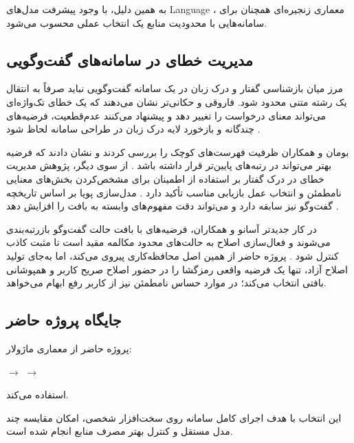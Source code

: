 به همین دلیل، با وجود پیشرفت مدل‌های  Language ،
معماری زنجیره‌ای همچنان برای سامانه‌هایی با محدودیت منابع
یک انتخاب عملی محسوب می‌شود.


\subsection{مدیریت خطای  در سامانه‌های گفت‌وگویی}

مرز میان بازشناسی گفتار و درک زبان در یک سامانه گفت‌وگویی
نباید صرفاً به انتقال یک رشته متنی محدود شود. فاروقی و
حکانی‌تر نشان می‌دهند که یک خطای تک‌واژه‌ای می‌تواند معنای
درخواست را تغییر دهد و پیشنهاد می‌کنند عدم‌قطعیت، فرضیه‌های
چندگانه و بازخورد لایه درک زبان در طراحی سامانه لحاظ شود
\cite{faruqui2022boundary}.

بومان و همکاران ظرفیت فهرست‌های کوچک  را بررسی کردند
و نشان دادند که فرضیه بهتر می‌تواند در رتبه‌های پایین‌تر قرار
داشته باشد \cite{baumann2009nbest}. از سوی دیگر، پژوهش مدیریت
خطای  در درک گفتار بر استفاده از اطمینان برای مشخص‌کردن
بخش‌های معنایی نامطمئن و انتخاب عمل بازیابی مناسب تأکید دارد
\cite{simonnet2017asrerror}. مدل‌سازی پویا بر اساس تاریخچه گفت‌وگو
نیز سابقه دارد و می‌تواند دقت مفهوم‌های وابسته به بافت را افزایش
دهد \cite{raux2010dynamic}.

در کار جدیدتر آسانو و همکاران، فرضیه‌های  با بافت حالت
گفت‌وگو بازرتبه‌بندی می‌شوند و فعال‌سازی اصلاح به حالت‌های محدود
مکالمه مقید است تا مثبت کاذب کنترل شود \cite{asano2025contextual}.
پروژه حاضر از همین اصل محافظه‌کاری پیروی می‌کند، اما به‌جای تولید
اصلاح آزاد، تنها یک فرضیه واقعی رمزگشا را در حضور اصلاح صریح
کاربر و همپوشانی بافتی انتخاب می‌کند؛ در موارد حساس نامطمئن نیز
از کاربر رفع ابهام می‌خواهد.


\subsection{جایگاه پروژه حاضر}

پروژه حاضر از معماری ماژولار:

\begin{center}
$\longrightarrow$
$\longrightarrow$
\end{center}

استفاده می‌کند.

این انتخاب با هدف اجرای کامل سامانه روی سخت‌افزار شخصی،
امکان مقایسه چند مدل مستقل و کنترل بهتر مصرف منابع انجام شده
است.

